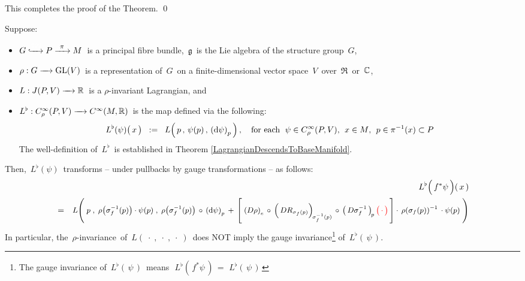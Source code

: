 \vskip 0.3cm
\noindent
This completes the proof of the Theorem.
\qed


\vskip 0.5cm
\begin{theorem}
\mbox{}
\vskip 0.1cm
\noindent
Suppose:
\begin{itemize}
\item
    \vskip -0.2cm
    $G \xhookrightarrow{{\color{white}222}} P \xrightarrow{{\color{white}2}\pi{\color{white}2}} M$\,
    is a principal fibre bundle, \,$\mathfrak{g}$\, is the Lie algebra of the structure group \,$G$,\,
\item
    $\rho : G \xrightarrow{{\color{white}....}}\GL(V)$\,
    is a representation of \,$G$\,
    on a finite-dimensional vector space \,$V$\, over \,$\Re$\, or \,$\mathbb{C}$,\,
\item
    $L : J(P,V) \xrightarrow{{\color{white}....}} \Re$\,
    is a {\color{red}$\rho$-invariant Lagrangian}, and
\item
    $L^{\flat} : C^{\infty}_{\rho}(P,V) \xrightarrow{{\color{white}....}} C^{\infty}(M,\Re)$\,
    is the map defined via the following:
    \begin{equation*}
    L^{\flat}(\psi)\!\left(\,\overset{{\color{white}.}}{x}\,\right)
    \;\; := \;\;
        L\!\left(\,
            \overset{{\color{white}1}}{p}
            \,,\,
            \psi(p)
            \,,\,
            \left(\d\psi\right)_{p}
            \,\right),
    \quad
    \textnormal{for each \;$\psi \in C^{\infty}_{\rho}(P,V)$,\; $x \in M$,\; $p \in \pi^{-1}(x) \subset P$}
    \end{equation*}
    The well-definition of \,$L^{\flat}$\, is established in
    Theorem \ref{LagrangianDescendsToBaseManifold}.
\end{itemize}
Then,
\,$L^{\flat}\!\left(\psi\right)$\,
transforms
-- under pullbacks by gauge transformations --
as follows:
\begin{eqnarray*}
&&
    L^{\flat}\!\left(\,\overset{{\color{white}.}}{f^{*}\psi}\,\right)\!(\,x\,)
\\
& = &
    \textnormal{\small$
    L\!\left(\;
        p
        \;,\;
        \rho\!\left(\sigma_{f}^{-1}(p)\right)\cdot\psi(p)
        \;,\;
        \rho\!\left(\sigma_{f}^{-1}(p)\right)\,\circ\,\left(\d\psi\right)_{p}
        \,+\,
        \left[\;
            \left(D\rho\right)_{e}
            \,\circ\,
            \left(\,\overset{{\color{white}.}}{DR_{\sigma_{f}(p)}}\right)_{\!\sigma_{f}^{-1}(p)}
            \,\circ\,
            \left(\,D\sigma_{f}^{-1}\,\right)_{\!p}
            {\color{red}\left(\,\overset{{\color{white}.}}{\cdot}\,\right)}
            \,\right]
        \cdot\,
        {\color{black}\rho(\sigma_{f}(p))^{-1}}
        \,\cdot
        \psi(p)
        \;\right)
    $}
\end{eqnarray*}
In particular, the \,$\rho$-invariance\, of \,$L(\;\cdot\;,\;\cdot\;,\;\cdot\;)$\,
does NOT imply the gauge
invariance\footnote{
The gauge invariance of
\,$L^{\flat}(\,\psi\,)$\,
means
\,\,$L^{\flat}(\,f^{*}\psi\,) \,=\, \,L^{\flat}(\,\psi\,)$\,
}
of \,$L^{\flat}(\,\psi\,)$.\,
\end{theorem}
